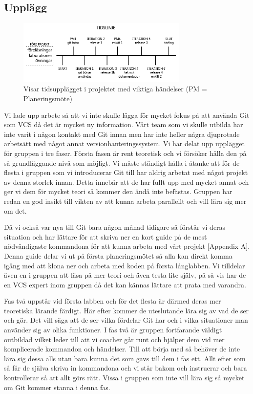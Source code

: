 \subsection{Upplägg}
\label{Upplagg}

\begin{figure}[htb!]\centering\includegraphics[width=0.75\textwidth]{Tidslinje.png}\caption{Visar tidsupplägget i projektet med viktiga händelser (PM = Planeringsmöte)}\label{fig:Timeline}\end{figure}

Vi lade upp arbete så att vi inte skulle lägga för mycket fokus på att använda Git som VCS då det är mycket ny information. Vårt team som vi skulle utbilda har inte varit i någon kontakt med Git innan men har inte heller några djuprotade arbetsätt med något annat versionhanteringssystem. Vi har delat upp upplägget för gruppen i tre faser. Första fasen är rent teoretisk och vi försöker hålla den på så grundläggande nivå som möjligt. Vi måste ständigt hålla i åtanke att för de flesta i gruppen som vi introducerar Git till har aldrig arbetat med något projekt av denna storlek innan. Detta innebär att de har fullt upp med mycket annat och ger vi dem för mycket teori så kommer den ändå inte befästas. Gruppen har redan en god insikt till vikten av att kunna arbeta parallellt och vill lära sig mer om det. 

Då vi också var nya till Git bara någon månad tidigare så förstår vi deras situation och har lättare för att skriva ner en kort guide på de mest nödvändigaste kommandona för att kunna arbeta med vårt projekt [Appendix A]. Denna guide delar vi ut på första planeringsmötet så alla kan direkt komma igång med att klona ner och arbeta med koden på första långlabben. Vi tilldelar även en i gruppen att läsa på mer teori och även testa lite själv, på så vis har de en VCS expert inom gruppen då det kan kännas lättare att prata med varandra.
 
Fas två uppstår vid första labben och för det flesta är därmed deras mer teoretiska lärande färdigt. Här efter kommer de uteslutande lära sig av vad de ser och gör. Det vill säga att de ser vilka fördelar Git har och i vilka situationer man använder sig av olika funktioner. I fas två är gruppen fortfarande väldigt outbildad vilket leder till att vi coacher går runt och hjälper dem vid mer komplicerade kommandon och händelser. Till att börja med så behöver de inte lära sig dessa alls utan bara kunna det som gavs till dem i fas ett. Allt efter som så får de själva skriva in kommandona och vi står bakom och instruerar och bara kontrollerar så att allt görs rätt. Vissa i gruppen som inte vill lära sig så mycket om Git kommer stanna i denna fas.

